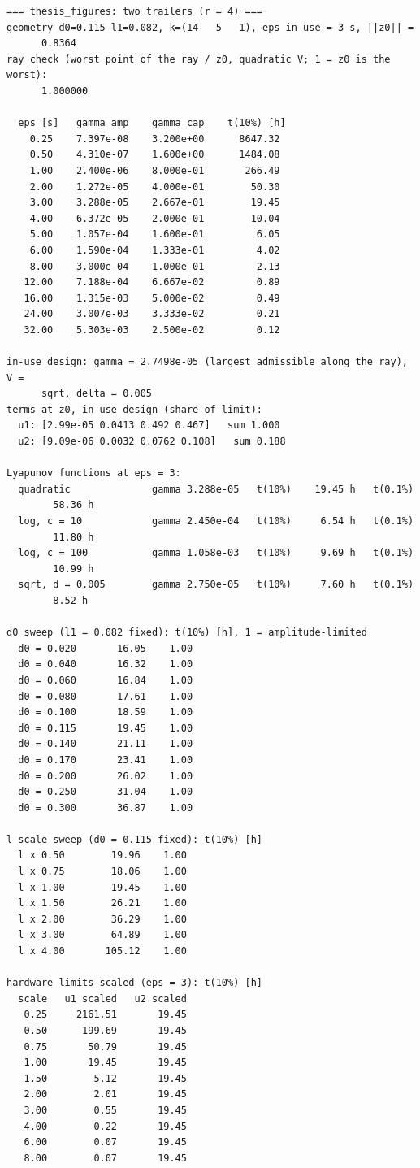 {\footnotesize\begin{verbatim}
=== thesis_figures: two trailers (r = 4) ===
geometry d0=0.115 l1=0.082, k=(14   5   1), eps in use = 3 s, ||z0|| =
      0.8364
ray check (worst point of the ray / z0, quadratic V; 1 = z0 is the worst):
      1.000000

  eps [s]   gamma_amp    gamma_cap    t(10%) [h]
    0.25    7.397e-08    3.200e+00      8647.32
    0.50    4.310e-07    1.600e+00      1484.08
    1.00    2.400e-06    8.000e-01       266.49
    2.00    1.272e-05    4.000e-01        50.30
    3.00    3.288e-05    2.667e-01        19.45
    4.00    6.372e-05    2.000e-01        10.04
    5.00    1.057e-04    1.600e-01         6.05
    6.00    1.590e-04    1.333e-01         4.02
    8.00    3.000e-04    1.000e-01         2.13
   12.00    7.188e-04    6.667e-02         0.89
   16.00    1.315e-03    5.000e-02         0.49
   24.00    3.007e-03    3.333e-02         0.21
   32.00    5.303e-03    2.500e-02         0.12

in-use design: gamma = 2.7498e-05 (largest admissible along the ray), V =
      sqrt, delta = 0.005
terms at z0, in-use design (share of limit):
  u1: [2.99e-05 0.0413 0.492 0.467]   sum 1.000
  u2: [9.09e-06 0.0032 0.0762 0.108]   sum 0.188

Lyapunov functions at eps = 3:
  quadratic              gamma 3.288e-05   t(10%)    19.45 h   t(0.1%)
        58.36 h
  log, c = 10            gamma 2.450e-04   t(10%)     6.54 h   t(0.1%)
        11.80 h
  log, c = 100           gamma 1.058e-03   t(10%)     9.69 h   t(0.1%)
        10.99 h
  sqrt, d = 0.005        gamma 2.750e-05   t(10%)     7.60 h   t(0.1%)
        8.52 h

d0 sweep (l1 = 0.082 fixed): t(10%) [h], 1 = amplitude-limited
  d0 = 0.020       16.05    1.00
  d0 = 0.040       16.32    1.00
  d0 = 0.060       16.84    1.00
  d0 = 0.080       17.61    1.00
  d0 = 0.100       18.59    1.00
  d0 = 0.115       19.45    1.00
  d0 = 0.140       21.11    1.00
  d0 = 0.170       23.41    1.00
  d0 = 0.200       26.02    1.00
  d0 = 0.250       31.04    1.00
  d0 = 0.300       36.87    1.00

l scale sweep (d0 = 0.115 fixed): t(10%) [h]
  l x 0.50        19.96    1.00
  l x 0.75        18.06    1.00
  l x 1.00        19.45    1.00
  l x 1.50        26.21    1.00
  l x 2.00        36.29    1.00
  l x 3.00        64.89    1.00
  l x 4.00       105.12    1.00

hardware limits scaled (eps = 3): t(10%) [h]
  scale   u1 scaled   u2 scaled
   0.25     2161.51       19.45
   0.50      199.69       19.45
   0.75       50.79       19.45
   1.00       19.45       19.45
   1.50        5.12       19.45
   2.00        2.01       19.45
   3.00        0.55       19.45
   4.00        0.22       19.45
   6.00        0.07       19.45
   8.00        0.07       19.45


\end{verbatim}}
